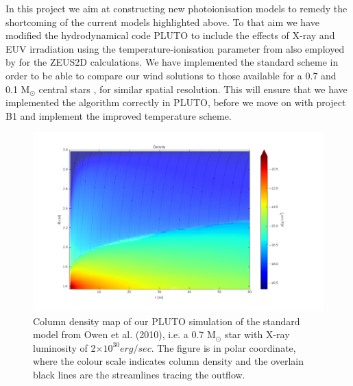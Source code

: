 \documentclass[10pt,fleqn,twoside]{article}
\begin{document}
In this project we aim at constructing new photoionisation models to
remedy the shortcoming of the current models highlighted above. To
that aim we have modified the hydrodynamical code PLUTO 
\citep{2007ApJS..170..228M, 2012A&A...545A.152M}
to include the
effects of X-ray and EUV irradiation using the temperature-ionisation
parameter from 
\citet{2008ApJ...688..398E, 2009ApJ...699.1639E}
also employed by 
\citet{2010MNRAS.401.1415O}
for the ZEUS2D calculations. We have implemented the
standard scheme in order to be able to compare our wind solutions to 
those available for a 0.7 and 0.1 M$_\odot$ central
stars 
\citep{2010MNRAS.401.1415O, 2011MNRAS.412...13O, 2012MNRAS.422.1880O},
for similar spatial
resolution. This will ensure that we have implemented the algorithm
correctly in PLUTO, before we move on with project B1 and implement
the improved temperature scheme. 



\begin{figure}
  \includegraphics[width=0.85\linewidth]{densvel2.png}
  \caption{Column density map of our PLUTO simulation of the standard
    model from Owen et al. (2010), i.e. a 0.7 M$_{\odot}$ star with
X-ray luminosity of 2$\times 10^{30} erg/sec$. The figure is in polar coordinate,
    where the colour scale indicates column density and the overlain
    black lines are the streamlines tracing the outflow. }
  \label{fig:streamlines}
\end{figure}



\end{document}
